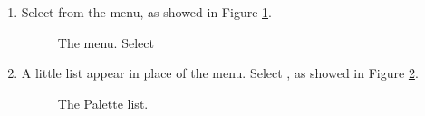 \begin{enumerate}
\item
  Select  from the  menu, as showed in Figure
  \ref{fig:palette_menu}.
%
\begin{figure}[htb]
\caption{The  menu. Select }
\label{fig:palette_menu}
\end{figure}

\item
  A little list appear in place of the menu. Select ,
  as showed in Figure
  \ref{fig:palette_menu2}.
%
\begin{figure}[htb]
\caption{The Palette list.}
\label{fig:palette_menu2}
\end{figure}



\end{enumerate}
